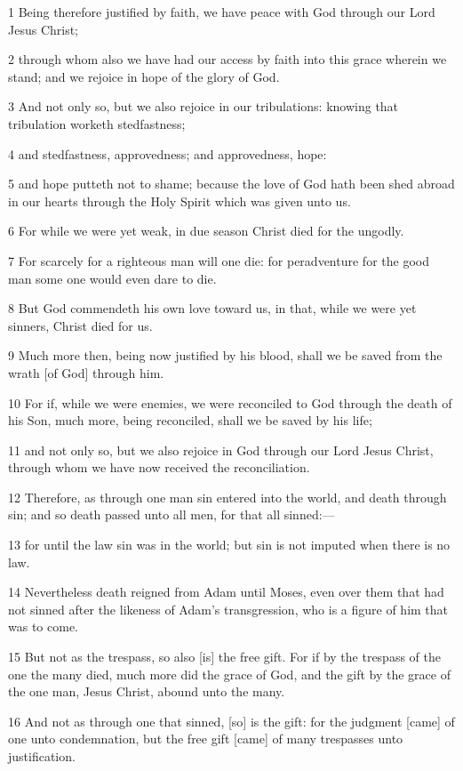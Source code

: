 \par 1 Being therefore justified by faith, we have peace with God through our Lord Jesus Christ;
\par 2 through whom also we have had our access by faith into this grace wherein we stand; and we rejoice in hope of the glory of God.
\par 3 And not only so, but we also rejoice in our tribulations: knowing that tribulation worketh stedfastness;
\par 4 and stedfastness, approvedness; and approvedness, hope:
\par 5 and hope putteth not to shame; because the love of God hath been shed abroad in our hearts through the Holy Spirit which was given unto us.
\par 6 For while we were yet weak, in due season Christ died for the ungodly.
\par 7 For scarcely for a righteous man will one die: for peradventure for the good man some one would even dare to die.
\par 8 But God commendeth his own love toward us, in that, while we were yet sinners, Christ died for us.
\par 9 Much more then, being now justified by his blood, shall we be saved from the wrath [of God] through him.
\par 10 For if, while we were enemies, we were reconciled to God through the death of his Son, much more, being reconciled, shall we be saved by his life;
\par 11 and not only so, but we also rejoice in God through our Lord Jesus Christ, through whom we have now received the reconciliation.
\par 12 Therefore, as through one man sin entered into the world, and death through sin; and so death passed unto all men, for that all sinned:—
\par 13 for until the law sin was in the world; but sin is not imputed when there is no law.
\par 14 Nevertheless death reigned from Adam until Moses, even over them that had not sinned after the likeness of Adam's transgression, who is a figure of him that was to come.
\par 15 But not as the trespass, so also [is] the free gift. For if by the trespass of the one the many died, much more did the grace of God, and the gift by the grace of the one man, Jesus Christ, abound unto the many.
\par 16 And not as through one that sinned, [so] is the gift: for the judgment [came] of one unto condemnation, but the free gift [came] of many trespasses unto justification.
